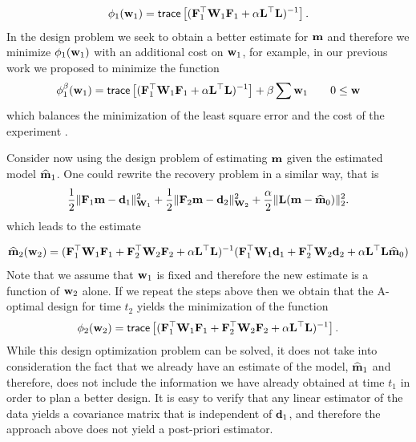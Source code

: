 \documentclass[11pt]{article}
\newcommand{\bfF}	{{\bf{F}}}
\newcommand{\bfL}	{{\bf{L}}}
\newcommand{\bfW}	{{\bf{W}}}
\newcommand{\bfd}	{{\bf{d}}}
\newcommand{\bfm}	{{\bf{m}}}
\newcommand{\bfw}	{{\bf{w}}}
\newcommand{\hf}        {{\frac 12}}
\newcommand{\LtL}       { \bfL^{\top}\bfL}
\renewcommand{\hf}		 {\frac12}
\newcommand{\bfmhat}    {{\widehat{\bfm}}}
\begin{document}
\begin{eqnarray}
\label{design1}
\phi_{1}(\bfw_1 ) =  {\sf trace} \left[   (\bfF_{1}^{\top}\bfW_{1}\bfF_{1}   + 
 {\alpha} \LtL)^{-1} \right]. 
\end{eqnarray}
In the design problem we seek to obtain a better estimate for $\bfm$ and therefore
we minimize $\phi_{1}(\bfw_{1})$ with an additional cost on $\bfw_{1}$, for example, in our
previous work we proposed to minimize the function
\begin{eqnarray}
\label{designp1}
\phi_{1}^{\beta}(\bfw_1 ) =  {\sf trace} \left[   (\bfF_{1}^{\top}\bfW_{1}\bfF_{1}   + 
 {\alpha} \LtL)^{-1} \right]  + \beta \sum \bfw_{1} \quad \quad 0 \le \bfw 
\end{eqnarray}
which balances the minimization of the least square error and the cost of the experiment \cite{Haber2008}.


\bigskip

Consider now using the design problem of estimating $\bfm$ given the estimated model $\widehat \bfm_{1}$.
One could rewrite the recovery problem in a similar way, that is
\begin{eqnarray}
\label{mest2}
\hf \| \bfF_{1} \bfm - \bfd_{1}\|^{2}_{\bfW_{1}} + \hf \| \bfF_{2} \bfm - \bfd_{2}\|^{2}_{\bfW_{2}}  + {\frac {\alpha} 2}
\|\bfL (\bfm -\bfmhat_{0}) \|^{2}_2. 
\end{eqnarray}
which leads to the estimate

\begin{eqnarray}
\label{mest2}
\bfmhat_{2}(\bfw_{2}) = (\bfF_{1}^{\top} \bfW_{1}\bfF_{1} +
\bfF_{2}^{\top} \bfW_{2}\bfF_{2} + \alpha \LtL)^{-1} (\bfF_{1}^{\top} \bfW_{1} \bfd_{1} +\bfF_{2}^{\top} \bfW_{2} \bfd_{2}
+ \alpha \LtL \bfmhat_{0})
\end{eqnarray}
Note that we assume that $\bfw_{1}$ is fixed and therefore the new estimate is a function of $\bfw_{2}$ alone.
If we repeat the steps above then we obtain that the A-optimal design for time $t_{2}$ yields the minimization of
the function
\begin{eqnarray}
\label{design2na}
\phi_{2}(\bfw_{2} ) =  {\sf trace} \left[   (\bfF_{1}^{\top}\bfW_{1}\bfF_{1}   + \bfF_{2}^{\top}\bfW_{2}\bfF_{2} +
\alpha \LtL)^{-1} \right]. 
\end{eqnarray}
While this design optimization problem can be solved, it does not take into consideration the fact that 
we already  have an estimate of the model, $\bfmhat_{1}$ and therefore, does not include the 
information we have already obtained at time $t_{1}$ in order to plan a better design.
It is easy to verify that any linear estimator of the data yields a covariance matrix that is independent of $\bfd_{1}$,
and therefore the approach above does not yield a post-priori estimator.
\end{document}
